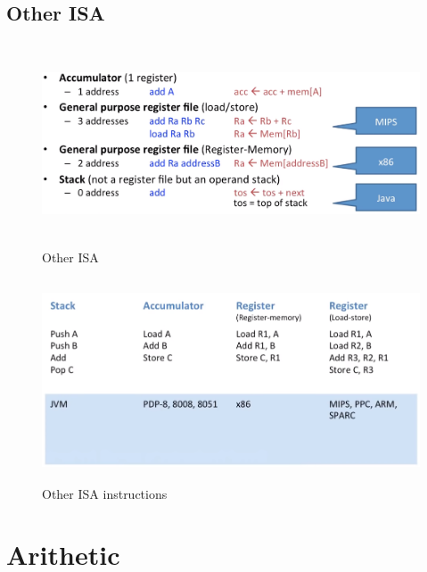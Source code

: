 \newpage
\subsection{Other ISA}
\begin{figure}[h]
    \vspace{10mm}
    \centering
    \includegraphics[width=16cm, height=6cm]{image/other-isa.png} 
    \caption{Other ISA}
\end{figure}

\begin{figure}[h]
    \vspace{10mm}
    \centering
    \includegraphics[width=16cm, height=6cm]{image/other-isa-instructions.png} 
    \caption{Other ISA instructions}
    \label{other-isa-instructions}
\end{figure}



\newpage


\section{Arithetic}

